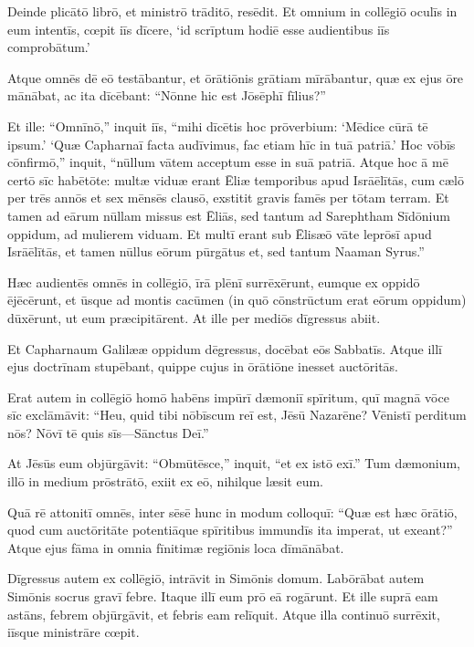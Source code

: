 \Versus Deinde plicātō librō, et ministrō trāditō, resēdit. Et omnium in collēgiō oculīs in eum intentīs,
\Versus cœpit iīs dīcere, `id scrīptum hodiē esse audientibus iīs comprobātum.'

\Versus Atque omnēs dē eō testābantur, et ōrātiōnis grātiam mīrābantur, quæ ex ejus ōre mānābat, ac ita dīcēbant: ``Nōnne hic est Jōsēphī fīlius?''

\Versus Et ille: ``Omnīnō,'' inquit iīs, ``mihi dīcētis hoc prōverbium: `Mēdice cūrā tē ipsum.' `Quæ Capharnaī facta audīvimus, fac etiam hīc in tuā patriā.'
\Versus Hoc vōbīs cōnfirmō,'' inquit, ``nūllum vātem acceptum esse in suā patriā.
\Versus Atque hoc ā mē certō sīc habētōte: multæ viduæ erant Ēliæ temporibus apud Isrāēlītās, cum cælō per trēs annōs et sex mēnsēs clausō, exstitit gravis famēs per tōtam terram.
\Versus Et tamen ad eārum nūllam missus est Ēliās, sed tantum ad Sarephtham Sīdōnium oppidum, ad mulierem viduam.
\Versus Et multī erant sub Ēlisæō vāte leprōsī apud Isrāēlītās, et tamen nūllus eōrum pūrgātus et, sed tantum Naaman Syrus.''

\Versus Hæc audientēs omnēs in collēgiō, īrā plēnī surrēxērunt,
\Versus eumque ex oppidō ējēcērunt, et ūsque ad montis cacūmen (in quō cōnstrūctum erat eōrum oppidum) dūxērunt, ut eum præcipitārent.
\Versus At ille per mediōs dīgressus abiit.

\Versus Et Capharnaum Galilææ oppidum dēgressus, docēbat eōs Sabbatīs.
\Versus Atque illī ejus doctrīnam stupēbant, quippe cujus in ōrātiōne inesset auctōritās.

\Versus Erat autem in collēgiō homō habēns impūrī dæmoniī spīritum, quī magnā vōce sīc exclāmāvit:
\Versus ``Heu, quid tibi nōbīscum reī est, Jēsū Nazarēne? Vēnistī perditum nōs? Nōvī tē quis sīs—Sānctus Deī.''

\Versus At Jēsūs eum objūrgāvit: ``Obmūtēsce,'' inquit, ``et ex istō exī.'' Tum dæmonium, illō in medium prōstrātō, exiit ex eō, nihilque læsit eum.

\Versus Quā rē attonitī omnēs, inter sēsē hunc in modum colloquī: ``Quæ est hæc ōrātiō, quod cum auctōritāte potentiāque spīritibus immundīs ita imperat, ut exeant?''
\Versus Atque ejus fāma in omnia fīnitimæ regiōnis loca dīmānābat.

\Versus Dīgressus autem ex collēgiō, intrāvit in Simōnis domum. Labōrābat autem Simōnis socrus gravī febre. Itaque illī eum prō eā rogārunt.
\Versus Et ille suprā eam astāns, febrem objūrgāvit, et febris eam relīquit. Atque illa continuō surrēxit, iīsque ministrāre cœpit.

